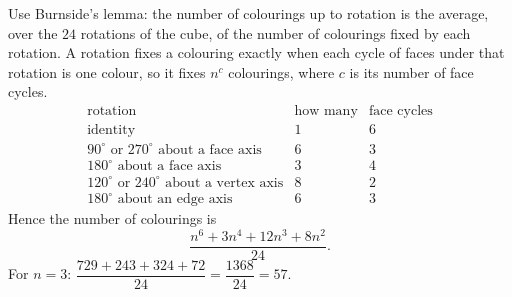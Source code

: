Use Burnside's lemma: the number of colourings up to rotation is the average, over the $24$ rotations of the cube, of the number of colourings fixed by each rotation. A rotation fixes a colouring exactly when each cycle of faces under that rotation is one colour, so it fixes $n^{c}$ colourings, where $c$ is its number of face cycles.
\[
\begin{array}{l|c|c}
\text{rotation} & \text{how many} & \text{face cycles}\\ \hline
\text{identity} & 1 & 6\\
90^\circ\text{ or }270^\circ\text{ about a face axis} & 6 & 3\\
180^\circ\text{ about a face axis} & 3 & 4\\
120^\circ\text{ or }240^\circ\text{ about a vertex axis} & 8 & 2\\
180^\circ\text{ about an edge axis} & 6 & 3
\end{array}
\]
Hence the number of colourings is
\[
\dfrac{n^6+3n^4+12n^3+8n^2}{24}.
\]
For $n=3$: $\dfrac{729+243+324+72}{24}=\dfrac{1368}{24}=\boxed{57}$.

